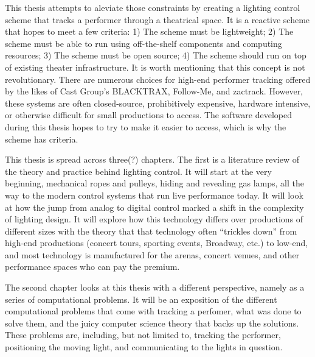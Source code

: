 \documentclass[12pt,twoside]{reedthesis}
\begin{document}

    This thesis attempts to aleviate those constraints by creating a lighting control scheme that tracks a performer through a theatrical space. It is a reactive scheme that hopes to meet a few criteria: 1) The scheme must be lightweight; 2) The scheme must be able to run using off-the-shelf components and computing resources; 3) The scheme must be open source; 4) The scheme should run on top of existing theater infrastructure. It is worth mentioning that this concept is not revolutionary. There are numerous choices for high-end performer tracking offered by the likes of Cast Group's BLACKTRAX, Follow-Me, and zactrack. However, these systems are often closed-source, prohibitively expensive, hardware intensive, or otherwise difficult for small productions to access. The software developed during this thesis hopes to try to make it easier to access, which is why the scheme has criteria. 
    
    
    This thesis is spread across three(?) chapters. The first is a literature review of the theory and practice behind lighting control. It will start at the very beginning, mechanical ropes and pulleys, hiding and revealing gas lamps, all the way to the modern control systems that run live performance today. It will look at how the jump from analog to digital control marked a shift in the complexity of lighting design. It will explore how this technology differs over productions of different sizes with the theory that that technology often “trickles down” from high-end productions (concert tours, sporting events, Broadway, etc.) to low-end, and most technology is manufactured for the arenas, concert venues, and other performance spaces who can pay the premium.
    
    
    The second chapter looks at this thesis with a different perspective, namely as a series of computational problems. It will be an exposition of the different computational problems that come with tracking a perfomer, what was done to solve them, and the juicy computer science theory that backs up the solutions. These problems are, including, but not limited to, tracking the performer, positioning the moving light, and communicating to the lights in question.
    
\end{document}
